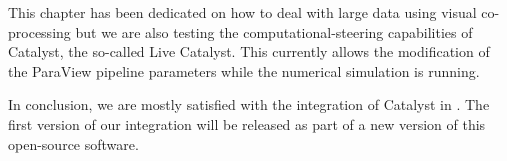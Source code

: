 This chapter has been dedicated on how to deal with large data using visual
co-processing but we are also testing the computational-steering capabilities of
Catalyst, the so-called Live Catalyst. This currently allows the modification of
the ParaView pipeline parameters while the numerical simulation is running.

In conclusion, we are mostly satisfied with the integration of Catalyst in
\CS. The first version of our integration will be released as part of a
new version of this open-source software.



